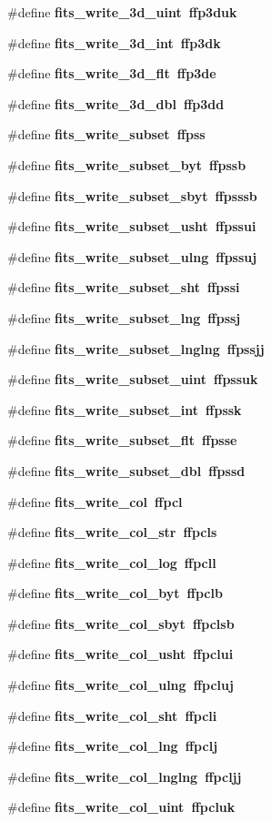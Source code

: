 \begin{CompactItemize}
\#define \bf{fits\_\-write\_\-3d\_\-uint}~ffp3duk
\item 
\#define \bf{fits\_\-write\_\-3d\_\-int}~ffp3dk
\item 
\#define \bf{fits\_\-write\_\-3d\_\-flt}~ffp3de
\item 
\#define \bf{fits\_\-write\_\-3d\_\-dbl}~ffp3dd
\item 
\#define \bf{fits\_\-write\_\-subset}~ffpss
\item 
\#define \bf{fits\_\-write\_\-subset\_\-byt}~ffpssb
\item 
\#define \bf{fits\_\-write\_\-subset\_\-sbyt}~ffpsssb
\item 
\#define \bf{fits\_\-write\_\-subset\_\-usht}~ffpssui
\item 
\#define \bf{fits\_\-write\_\-subset\_\-ulng}~ffpssuj
\item 
\#define \bf{fits\_\-write\_\-subset\_\-sht}~ffpssi
\item 
\#define \bf{fits\_\-write\_\-subset\_\-lng}~ffpssj
\item 
\#define \bf{fits\_\-write\_\-subset\_\-lnglng}~ffpssjj
\item 
\#define \bf{fits\_\-write\_\-subset\_\-uint}~ffpssuk
\item 
\#define \bf{fits\_\-write\_\-subset\_\-int}~ffpssk
\item 
\#define \bf{fits\_\-write\_\-subset\_\-flt}~ffpsse
\item 
\#define \bf{fits\_\-write\_\-subset\_\-dbl}~ffpssd
\item 
\#define \bf{fits\_\-write\_\-col}~ffpcl
\item 
\#define \bf{fits\_\-write\_\-col\_\-str}~ffpcls
\item 
\#define \bf{fits\_\-write\_\-col\_\-log}~ffpcll
\item 
\#define \bf{fits\_\-write\_\-col\_\-byt}~ffpclb
\item 
\#define \bf{fits\_\-write\_\-col\_\-sbyt}~ffpclsb
\item 
\#define \bf{fits\_\-write\_\-col\_\-usht}~ffpclui
\item 
\#define \bf{fits\_\-write\_\-col\_\-ulng}~ffpcluj
\item 
\#define \bf{fits\_\-write\_\-col\_\-sht}~ffpcli
\item 
\#define \bf{fits\_\-write\_\-col\_\-lng}~ffpclj
\item 
\#define \bf{fits\_\-write\_\-col\_\-lnglng}~ffpcljj
\item 
\#define \bf{fits\_\-write\_\-col\_\-uint}~ffpcluk
\item 

\end{CompactItemize}
